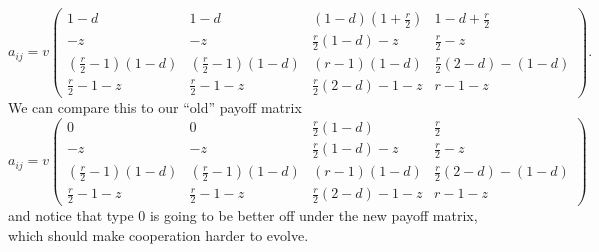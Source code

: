 \documentclass[13pt]{amsart}
\begin{document}
\begin{equation}
    a_{ij} = v
    \begin{pmatrix}
        1-d & 1-d & (1-d)(1+\frac{r}{2}) & 1-d + \frac{r}{2} \\
        -z & -z & \frac{r}{2}(1-d) -z & \frac{r}{2} -z \\
        (\frac{r}{2} - 1)(1-d) & (\frac{r}{2} - 1)(1-d) & (r-1)(1-d)& \frac{r}{2}(2 - d) - (1-d)\\
        \frac{r}{2} - 1 - z & \frac{r}{2} - 1 - z & \frac{r}{2}(2 - d) - 1 - z & r - 1 -z
    \end{pmatrix}.
\end{equation}
We can compare this to our ``old'' payoff matrix \begin{equation}
    a_{ij} = v
    \begin{pmatrix}
        0 & 0 & \frac{r}{2}(1-d) & \frac{r}{2} \\
        -z & -z & \frac{r}{2}(1-d) -z & \frac{r}{2} -z \\
        (\frac{r}{2} - 1)(1-d) & (\frac{r}{2} - 1)(1-d) & (r-1)(1-d)& \frac{r}{2}(2 - d) - (1-d)\\
        \frac{r}{2} - 1 - z & \frac{r}{2} - 1 -z & \frac{r}{2}(2 - d) - 1 - z & r - 1 -z
    \end{pmatrix}
\end{equation}
and notice that type $0$ is going to be better off under the new payoff matrix, which should make cooperation harder to evolve.
\end{document}
